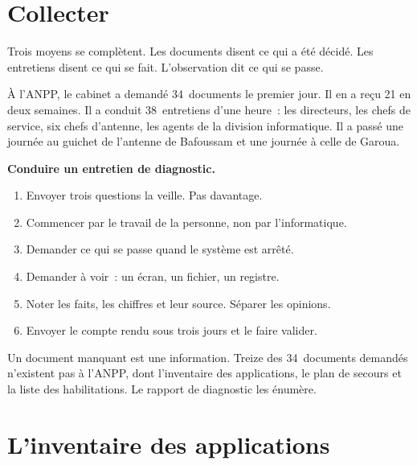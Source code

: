 \section{Collecter}
\label{sec:c09-collecter}

Trois moyens se complètent. Les documents disent ce qui a été décidé. Les entretiens disent ce qui se fait.
L'observation dit ce qui se passe.

À l'ANPP, le cabinet a demandé 34~documents le premier jour. Il en a reçu 21 en deux semaines. Il a conduit
38~entretiens d'une heure~: les directeurs, les chefs de service, six chefs d'antenne, les agents de la division
informatique. Il a passé une journée au guichet de l'antenne de Bafoussam et une journée à celle de Garoua.

\begin{boxprocedure}
\textbf{Conduire un entretien de diagnostic.}
\begin{enumerate}
    \item Envoyer trois questions la veille. Pas davantage.
    \item Commencer par le travail de la personne, non par l'informatique.
    \item Demander ce qui se passe quand le système est arrêté.
    \item Demander à voir~: un écran, un fichier, un registre.
    \item Noter les faits, les chiffres et leur source. Séparer les opinions.
    \item Envoyer le compte rendu sous trois jours et le faire valider.
\end{enumerate}
\end{boxprocedure}

Un document manquant est une information. Treize des 34~documents demandés n'existent pas à l'ANPP, dont
l'inventaire des applications, le plan de secours et la liste des habilitations. Le rapport de diagnostic les
énumère.

\section{L'inventaire des applications}
\label{sec:c09-inventaire}

